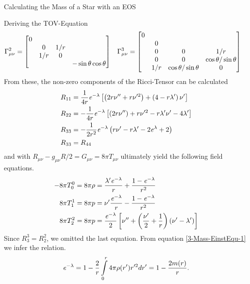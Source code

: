 \begin{section}{Calculating the Mass of a Star with an EOS}
\begin{subsection}{Deriving the TOV-Equation}
\begin{align}
	\Gamma_{\mu\nu}^2 &= \begin{bmatrix}
	                     	0 & & &\\
	                     	& 0 & 1/r &\\
	                     	& 1/r & 0 &\\
	                     	& & & -\sin\theta\cos\theta
	                     \end{bmatrix}\hspace{0.3cm}
	\Gamma_{\mu\nu}^3 = \begin{bmatrix}
	                     	0 & & &\\
	                     	& 0 & &\\
	                     	& 0 & 0 & 1/r\\
	                     	& 0 & 0 & \cos\theta/\sin\theta\\
	                     	& 1/r & \cos\theta/\sin\theta & 0
						\end{bmatrix}
\end{align}
From these, the non-zero components of the Ricci-Tensor can be calculated 
\begin{align}
	R_{11} &= \frac{1}{4r}\mathit{e}^{-\lambda}\left[\left(2r\nu''+r\nu'^2\right) + \left(4-r\lambda'\right)\nu'\right]\\
	R_{22} &= -\frac{1}{4r}\mathit{e}^{-\lambda}\left[\left(2r\nu''\right)+r\nu'^2-r\lambda'\nu'-4\lambda'\right]\\
	R_{33} &= -\frac{1}{2r^2}\mathit{e}^{-\lambda}\left(r\nu'-r\lambda'-2\mathit{e}^\lambda+2\right)\\
	R_{33} &= R_{44}
\end{align}
and with $R_{\mu\nu}-g_{\mu\nu}R/2=G_{\mu\nu}=8\pi T_{\mu\nu}$ ultimately yield the following field equations.
\begin{align}
	-8\pi T_0^0 = 8\pi\rho &= \frac{\lambda'\mathit{e}^{-\lambda}}{r}+\frac{1-\mathit{e}^{-\lambda}}{r^2}\label{3-Mass-EinstEqu-1}\\
	8\pi T_1^1 = 8\pi p &= \nu'\frac{\mathit{e}^{-\lambda}}{r} - \frac{1-\mathit{e}^{-\lambda}}{r^2}\label{3-Mass-EinstEqu-2}\\
	8\pi T_2^2 = 8\pi p &= \frac{\mathit{e}^{-\lambda}}{2}\left[\nu''+\left(\frac{\nu'}{2} + \frac{1}{r}\right)\left(\nu'-\lambda'\right) \right]\label{3-Mass-EinstEqu-3}
\end{align}
Since $R_3^3=R_2^2$, we omitted the last equation. From equation \eqref{3-Mass-EinstEqu-1} we infer the relation.
\begin{equation}
	\e^{-\lambda} = 1 - \frac{2}{r}\int\limits_0^r 4\pi\rho(r') r'^2dr' = 1 - \frac{2m(r)}{r}.

\end{equation}
\end{subsection}
\end{section}
